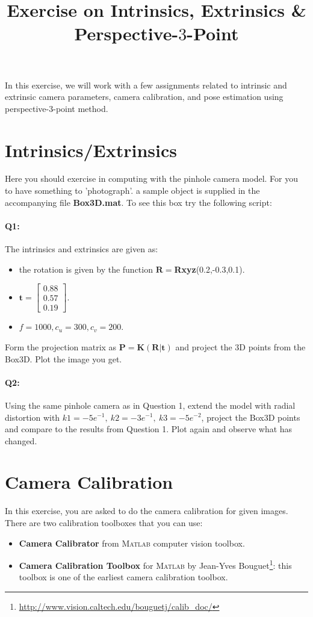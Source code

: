 \documentclass[a4paper]{article}
\begin{document}
\title{Exercise on Intrinsics, Extrinsics \& Perspective-$3$-Point}
\maketitle%

In this exercise, we will work with a few assignments related to intrinsic and extrinsic camera parameters, camera calibration, and pose estimation using perspective-3-point method.

\section{Intrinsics/Extrinsics}
Here you should exercise in computing with the pinhole camera model. For you to have something to 'photograph'. a sample object is supplied in the accompanying file \textbf{Box3D.mat}. To see this box try the following script:

\paragraph{Q1:} 
The intrinsics and extrinsics are given as: 
\begin{itemize}
\item the rotation is given by the function $\mathbf{R}=$\textbf{Rxyz}(0.2,-0.3,0.1).
\item $\mathbf{t}= \left[\begin{matrix}
0.88 \\ 0.57 \\  0.19
 \end{matrix}\right]$.
 \item $f=1000, c_u = 300, c_v = 200$.
\end{itemize}
Form the projection matrix as $\mathbf{P}=\mathbf{K}\left(\mathbf{R} | \mathbf{t}\right)$ and project the $3$D points from the Box3D. Plot the image you get. 
\paragraph{Q2:} 
Using the same pinhole camera as in Question 1, extend the model with radial distortion with $k1 = -5e^{-1},\ k2 = -3e^{-1},\ k3 = -5e^{-2}$, project the Box3D points and compare to the results from Question 1. Plot again and observe what has changed.

\section{Camera Calibration}
In this exercise, you are asked to do the camera calibration for given images. There are two calibration toolboxes that you can use:
\begin{itemize}
\item \textbf{Camera Calibrator} from \textsc{Matlab} computer vision toolbox.
\item \textbf{Camera Calibration Toolbox} for \textsc{Matlab} by Jean-Yves Bouguet\footnote{\url{http://www.vision.caltech.edu/bouguetj/calib_doc/}}: this toolbox is one of the earliest camera calibration toolbox.
\end{itemize}
\end{document}
